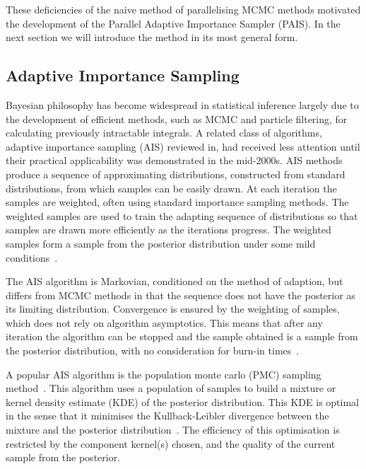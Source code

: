 \documentclass[final]{siamltex}
\begin{document}
These deficiencies of the naive method of parallelising MCMC methods
motivated the development of the Parallel Adaptive Importance Sampler
(PAIS). In the next section we will introduce the method in its most
general form.

\subsection{Adaptive Importance Sampling}

Bayesian philosophy has become wide\-spread in statistical inference
largely due to the development of efficient methods, such as MCMC and
particle filtering, for calculating previously intractable integrals.
A related class of algorithms, adaptive importance sampling (AIS)
\cite{liu2008monte} reviewed in\cite{bugallo2015adaptive}, had
received less attention until their practical applicability was
demonstrated in the
mid-2000s\cite{celeux2006iterated,cappepopulation,isard1998condensation,bink2008bayesian}.
AIS methods produce a sequence of approximating distributions,
constructed from standard distributions, from which samples can be
easily drawn. At each iteration the samples are weighted, often using
standard importance sampling methods. The weighted samples are used to
train the adapting sequence of distributions so that samples are drawn
more efficiently as the iterations progress. The weighted samples form
a sample from the posterior distribution under some mild
conditions~\cite{robert2013monte,martino2015adaptive}.

The AIS algorithm is Markovian, conditioned on the method of adaption,
but differs from MCMC methods in that the sequence does not have the
posterior as its limiting distribution. Convergence is ensured by the
weighting of samples, which does not rely on algorithm asymptotics.
This means that after any iteration the algorithm can be stopped and
the sample obtained is a sample from the posterior distribution, with
no consideration for burn-in times~\cite{douc2007convergence}.

A popular AIS algorithm is the population monte carlo (PMC) sampling
method~\cite{cappe2012population}. This algorithm uses a population of
samples to build a mixture or kernel density estimate (KDE) of the
posterior distribution. This KDE is optimal in the sense that it
minimises the Kullback-Leibler divergence between the mixture and the
posterior distribution~\cite{douc2007convergence}. The efficiency of
this optimisation is restricted by the component kernel(s) chosen, and
the quality of the current sample from the posterior.
\end{document}
